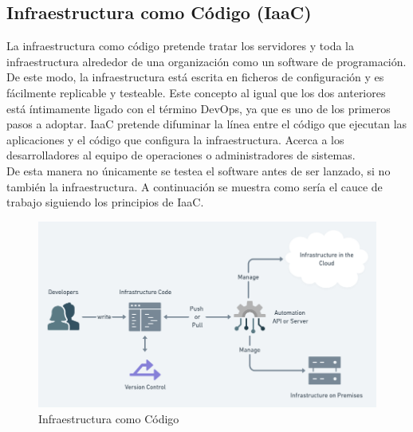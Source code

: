 	\subsection{Infraestructura como Código (IaaC)}
		\begin{text}
			La infraestructura como código pretende tratar los servidores y toda la infraestructura alrededor de una organización como un software de programación. De este modo, la infraestructura está escrita en ficheros de configuración y es fácilmente replicable y testeable. Este concepto al igual que los dos anteriores está íntimamente ligado con el término DevOps, ya que es uno de los primeros pasos a adoptar. IaaC pretende difuminar la línea entre el código que ejecutan las aplicaciones y el código que configura la infraestructura. Acerca a los desarrolladores al equipo de operaciones o administradores de sistemas. \\
			De esta manera no únicamente se testea el software antes de ser lanzado, si no también la infraestructura. A continuación se muestra como sería el cauce de trabajo siguiendo los principios de IaaC.
			
			\begin{figure}[!hbt]
				\centering
				\includegraphics[scale=0.75]{imagenes/Introduccion/Conceptos_Basicos/IaaC.png}
				\caption[Infraestructura como Código]{Infraestructura como Código \cite{WhatIsIaaC:online}}
				\label{infraestructura_como_codigo} 
			\end{figure}
		\end{text}
	
